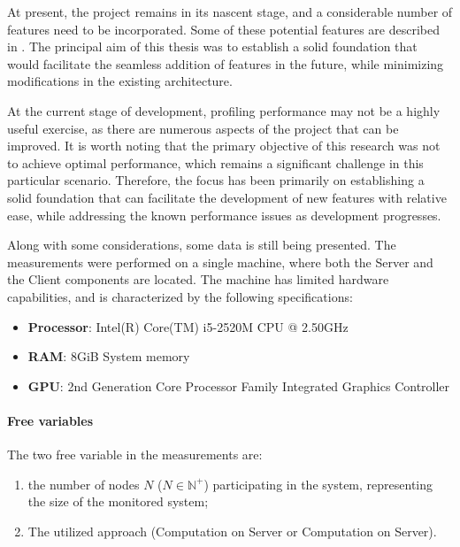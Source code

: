 At present, the project remains in its nascent stage, and a considerable number of features need to be incorporated. Some of these potential features are described in . The principal aim of this thesis was to establish a solid foundation that would facilitate the seamless addition of features in the future, while minimizing modifications in the existing architecture.\newline

At the current stage of development, profiling performance may not be a highly useful exercise, as there are numerous aspects of the project that can be improved. It is worth noting that the primary objective of this research was not to achieve optimal performance, which remains a significant challenge in this particular scenario. Therefore, the focus has been primarily on establishing a solid foundation that can facilitate the development of new features with relative ease, while addressing the known performance issues as development progresses.\newline

Along with some considerations, some data is still being presented. The measurements were performed on a single machine, where both the Server and the Client components are located. The machine has limited hardware capabilities, and is characterized by the following specifications:

\begin{itemize}
	\item \textbf{Processor}: Intel(R) Core(TM) i5-2520M CPU @ 2.50GHz
	\item \textbf{RAM}: 8GiB System memory
	\item \textbf{GPU}: 2nd Generation Core Processor Family Integrated Graphics Controller
\end{itemize}

\paragraph{Free variables}
The two free variable in the measurements are:
\begin{enumerate}
	\item the number of nodes $N$ ($N \in \mathbb{N}^{+}$) participating in the system, representing the size of the monitored system;
	\item The utilized approach (Computation on Server or Computation on Server).
\end{enumerate}
